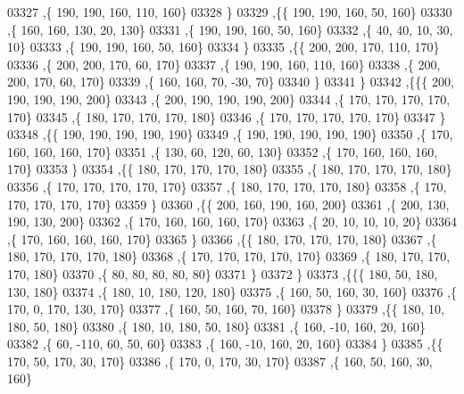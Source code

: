 \begin{DoxyCode}
03327     ,\{   190,   190,   160,   110,   160\}
03328     \}
03329    ,\{\{   190,   190,   160,    50,   160\}
03330     ,\{   160,   160,   130,    20,   130\}
03331     ,\{   190,   190,   160,    50,   160\}
03332     ,\{    40,    40,    10,    30,    10\}
03333     ,\{   190,   190,   160,    50,   160\}
03334     \}
03335    ,\{\{   200,   200,   170,   110,   170\}
03336     ,\{   200,   200,   170,    60,   170\}
03337     ,\{   190,   190,   160,   110,   160\}
03338     ,\{   200,   200,   170,    60,   170\}
03339     ,\{   160,   160,    70,   -30,    70\}
03340     \}
03341    \}
03342   ,\{\{\{   200,   190,   190,   190,   200\}
03343     ,\{   200,   190,   190,   190,   200\}
03344     ,\{   170,   170,   170,   170,   170\}
03345     ,\{   180,   170,   170,   170,   180\}
03346     ,\{   170,   170,   170,   170,   170\}
03347     \}
03348    ,\{\{   190,   190,   190,   190,   190\}
03349     ,\{   190,   190,   190,   190,   190\}
03350     ,\{   170,   160,   160,   160,   170\}
03351     ,\{   130,    60,   120,    60,   130\}
03352     ,\{   170,   160,   160,   160,   170\}
03353     \}
03354    ,\{\{   180,   170,   170,   170,   180\}
03355     ,\{   180,   170,   170,   170,   180\}
03356     ,\{   170,   170,   170,   170,   170\}
03357     ,\{   180,   170,   170,   170,   180\}
03358     ,\{   170,   170,   170,   170,   170\}
03359     \}
03360    ,\{\{   200,   160,   190,   160,   200\}
03361     ,\{   200,   130,   190,   130,   200\}
03362     ,\{   170,   160,   160,   160,   170\}
03363     ,\{    20,    10,    10,    10,    20\}
03364     ,\{   170,   160,   160,   160,   170\}
03365     \}
03366    ,\{\{   180,   170,   170,   170,   180\}
03367     ,\{   180,   170,   170,   170,   180\}
03368     ,\{   170,   170,   170,   170,   170\}
03369     ,\{   180,   170,   170,   170,   180\}
03370     ,\{    80,    80,    80,    80,    80\}
03371     \}
03372    \}
03373   ,\{\{\{   180,    50,   180,   130,   180\}
03374     ,\{   180,    10,   180,   120,   180\}
03375     ,\{   160,    50,   160,    30,   160\}
03376     ,\{   170,     0,   170,   130,   170\}
03377     ,\{   160,    50,   160,    70,   160\}
03378     \}
03379    ,\{\{   180,    10,   180,    50,   180\}
03380     ,\{   180,    10,   180,    50,   180\}
03381     ,\{   160,   -10,   160,    20,   160\}
03382     ,\{    60,  -110,    60,    50,    60\}
03383     ,\{   160,   -10,   160,    20,   160\}
03384     \}
03385    ,\{\{   170,    50,   170,    30,   170\}
03386     ,\{   170,     0,   170,    30,   170\}
03387     ,\{   160,    50,   160,    30,   160\}

\end{DoxyCode}
